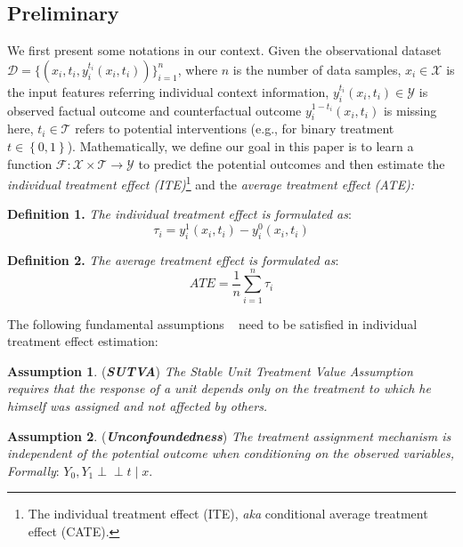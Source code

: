 \documentclass[sigconf]{acmart}
\begin{document}
\subsection{Preliminary}
We first present some notations in our context. Given the observational dataset $\mathcal{D}= \{ ( x_{i}, t_{i}, y_{i}^{t_{i}}(x_{i},t_{i}) )  \}_{i=1}^{n}$, where $n$ is the number of data samples, 
$x_{i} \in \mathcal{X}$ is the input features referring individual context information, $y_{i}^{t_{i}}(x_{i},t_{i}) \in \mathcal{Y}$ is observed factual outcome and counterfactual outcome $y_{i}^{1-t_{i}}(x_{i},t_{i})$ is missing here, $t_{i} \in \mathcal{T}$ refers to potential interventions (e.g., for binary treatment  $t \in \left \{0,1\right \}$). Mathematically, we define our goal in this paper is to learn a function $\mathcal{F}: \mathcal{X} \times \mathcal{T} \to \mathcal{Y}$ to predict the potential outcomes and then estimate the \textit{individual treatment effect (ITE)}\footnote{The individual treatment effect (ITE), \textit{aka} conditional average treatment effect (CATE).} and the \textit{average treatment effect (ATE):}\par
\textbf{Definition 1.} \textit{The individual treatment effect is formulated as}:
\begin{equation}
    \tau_{i}=y_{i}^{1}(x_{i},t_{i})-y_{i}^{0}(x_{i},t_{i})
\end{equation}\par
\textbf{Definition 2.} \textit{The average treatment effect is formulated as}:
\begin{equation}
    ATE=\frac{1}{n}\sum_{i=1}^{n}\tau_{i}
\end{equation}\par
The following fundamental assumptions ~\citep{Rosenbaum1983TheCR} need to be satisfied in individual treatment effect estimation:\par
\textbf{Assumption 1}. (\textit{\textbf{SUTVA}}) \textit{The Stable Unit Treatment Value Assumption requires that the response of a unit depends only on the treatment to which he himself was assigned and not affected by others.}
\par \textbf{Assumption 2}. (\textit{\textbf{Unconfoundedness}}) \textit{The treatment assignment mechanism is independent of the potential outcome when conditioning on the observed variables, Formally}: $Y_{0}, Y_{1} \perp \!\!\!\! \perp t \mid x$.\par
\end{document}
